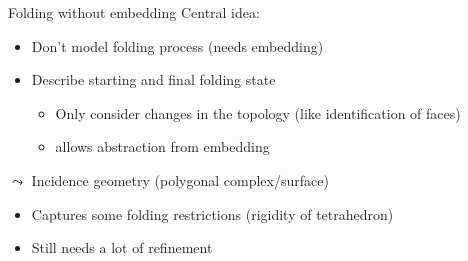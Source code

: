 \begin{frame}{Folding without embedding}
    \pause
    Central idea:
    \begin{itemize}
        \pause
        \item Don't model folding process (needs embedding)
        \pause
        \item Describe starting and final folding state
            \begin{itemize}
                \pause
                \item Only consider changes in the topology
                    \pause (like identification of faces)
                \pause
                \item allows abstraction from embedding
            \end{itemize}
    \end{itemize}


    \pause
    $\leadsto$ Incidence geometry (polygonal complex/surface)

    \begin{itemize}
        \pause
        \item Captures some folding restrictions \pause (rigidity of tetrahedron)
        \pause
        \item Still needs a lot of refinement
    \end{itemize}
\end{frame}

\newcommand{\colFaceA}{\colorFaceA}
\newcommand{\colFaceB}{\colorFaceB}
\newcommand{\colFaceC}{\colorFaceC}


